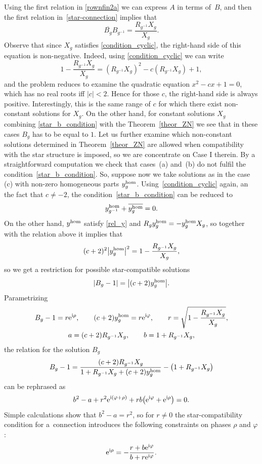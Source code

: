 \documentclass[10pt,a4paper]{amsart}
\numberwithin{equation}{section}
\begin{document}
Using the first relation in \eqref{rownfin2a} we can express $A$ in terms of~$B$, and then the first relation in~\eqref{star-connection} implies that
\begin{equation}\label{star_b_condition}
\overline{B_g}B_{g^{-1}}=\frac{R_{g^{-1}}X_g}{X_g}.
\end{equation}
Observe that since $X_g$ satisfies \eqref{condition_cyclic}, the right-hand side of this equation is non-negative. Indeed, using \eqref{condition_cyclic} we can write
\begin{equation*}
1-\frac{R_{g^{-1}}X_g}{X_g}=(R_{g^{-1}}X_g)^2-c(R_{g^{-1}}X_g)+1,
\end{equation*}
and the problem reduces to examine the quadratic equation $x^2-cx+1=0$, which has no real roots iff $|c|<2$. Hence for those $c$, the right-hand side is always positive. Interestingly, this is the same range of $c$ for which there exist non-constant solutions for $X_g$. On the other hand, for constant solutions $X_g$ combining \eqref{star_b_condition} with the Theorem~\ref{theor_ZN} we see that in these cases $B_g$ has to be equal to $1$. Let us further examine which non-constant solutions determined in Theorem~\ref{theor_ZN} are allowed when compatibility with the star structure is imposed, so we are concentrate on Case I therein. By a straightforward computation we check that cases~(a) and~(b) do not fulfil the condition~\eqref{star_b_condition}. So, suppose now we take solutions as in the case (c) with non-zero homogeneous parts $y_g^{{\rm hom}}$. Using~\ref{condition_cyclic} again, an the fact that $c\neq-2$, the condition~\eqref{star_b_condition} can be reduced to
\[ y_{g^{-1}}^{\rm hom}+\overline{y_g^{\rm hom}}=0.\]
On the other hand, $y^{{\rm hom}}$ satisfy \eqref{rel_y} and $R_gy_g^{\rm hom}=-y_g^{\rm hom}X_g$, so together with the relation above it implies that
\[ (c+2)^2\big|y_g^{\rm hom}\big|^2=1-\frac{R_{g^{-1}}X_g}{X_g},\]
so we get a restriction for possible star-compatible solutions
\[ |B_g-1|=\big|(c+2)y_g^{\rm hom}\big|.\]
Parametrizing
\begin{gather*}
B_g-1=r{\rm e}^{{\rm i}\rho}, \qquad (c+2)y_g^{\rm hom}=r{\rm e}^{{\rm i}\varphi}, \qquad r=\sqrt{1-\frac{R_{g^{-1}}X_g}{X_g}},\\
 a=(c+2)R_{g^{-1}}X_g, \qquad b=1+R_{g^{-1}}X_g,
\end{gather*}
the relation for the solution $B_g$
\[ B_g-1=\frac{(c+2)R_{g^{-1}}X_g}{1+R_{g^{-1}}X_g+(c+2)y_g^{\rm hom}}-\big(1+R_{g^{-1}}X_g\big)\]
can be rephrased as
\[ b^2-a+r^2{\rm e}^{{\rm i}(\varphi+\rho)}+rb\big({\rm e}^{{\rm i}\varphi}+{\rm e}^{{\rm i}\rho}\big)=0.\]
Simple calculations show that $b^2-a=r^2$, so for $r\neq 0$ the star-compatibility condition for a~connection introduces the following constraints on phases $\rho$ and $\varphi$:
\[ {\rm e}^{{\rm i}\rho}=-\frac{r+b{\rm e}^{{\rm i}\varphi}}{b+r{\rm e}^{{\rm i}\varphi}}.\]
\end{document}
